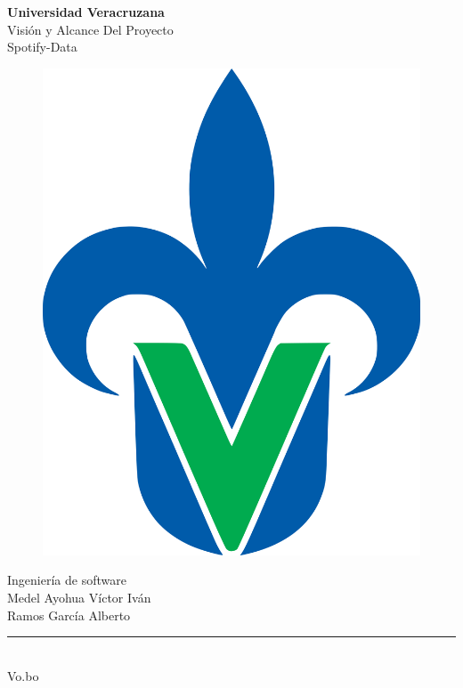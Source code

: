 \begin{titlepage}
	\begin{center}
	{\huge \textbf{Universidad Veracruzana}}\\
	\vspace{2cm}  
	{\Large {Visión y Alcance Del Proyecto}}\\
	\vspace{5mm}	
	{\Large {Spotify-Data}}\\
	\begin{figure}[h]
		\centering
		\includegraphics[scale=0.10]{uvlogo}
	\end{figure}
	{\Large {Ingeniería de software}}\\
    \vspace{2cm}
	{\Large {Medel Ayohua Víctor Iván}}\\
	\vspace{3mm}	
	{\Large {Ramos García Alberto}}\\
	\vspace{2cm}	
    \rule{8cm}{0.5mm} \\ \Large Vo.bo\\ 
	\end{center}
\end{titlepage}